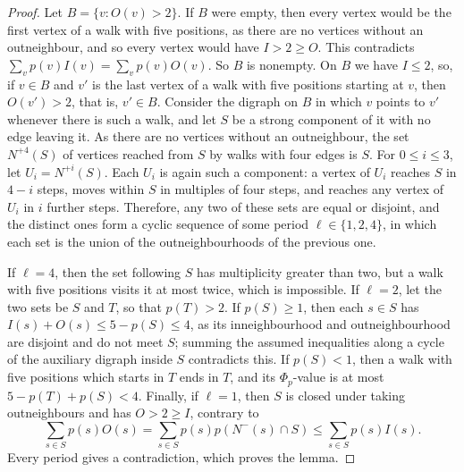 \begin{proof}
Let $B=\{v:O(v)>2\}$. If $B$ were empty, then every vertex would be the first vertex of a walk with five positions, as there are no vertices without an outneighbour, and so every vertex would have $I>2\ge O$. This contradicts $\sum_vp(v)I(v)=\sum_vp(v)O(v)$. So $B$ is nonempty.
On $B$ we have $I\le2$, so, if $v\in B$ and $v'$ is the last vertex of a walk with five positions starting at $v$, then $O(v')>2$, that is, $v'\in B$. Consider the digraph on $B$ in which $v$ points to $v'$ whenever there is such a walk, and let $S$ be a strong component of it with no edge leaving it. As there are no vertices without an outneighbour, the set $N^{+4}(S)$ of vertices reached from $S$ by walks with four edges is $S$. For $0\le i\le3$, let $U_i=N^{+i}(S)$. Each $U_i$ is again such a component: a vertex of $U_i$ reaches $S$ in $4-i$ steps, moves within $S$ in multiples of four steps, and reaches any vertex of $U_i$ in $i$ further steps. Therefore, any two of these sets are equal or disjoint, and the distinct ones form a cyclic sequence of some period $\ell\in\{1,2,4\}$, in which each set is the union of the outneighbourhoods of the previous one.

If $\ell=4$, then the set following $S$ has multiplicity greater than two, but a walk with five positions visits it at most twice, which is impossible.
If $\ell=2$, let the two sets be $S$ and $T$, so that $p(T)>2$. If $p(S)\ge1$, then each $s\in S$ has
$I(s)+O(s)\le5-p(S)\le4$, as its inneighbourhood and outneighbourhood are disjoint
and do not meet $S$; summing the assumed inequalities along a cycle of the auxiliary digraph inside $S$ contradicts this.
If $p(S)<1$, then a walk with five positions which starts in $T$ ends in $T$, and its $\Phi_p$-value is at most $5-p(T)+p(S)<4$.
Finally, if $\ell=1$, then $S$ is closed under taking outneighbours and has $O>2\ge I$, contrary to
\[
 \sum_{s\in S}p(s)O(s)
 =\sum_{s\in S}p(s)p(N^-(s)\cap S)
 \le\sum_{s\in S}p(s)I(s).
\]
Every period gives a contradiction, which proves the lemma.
\end{proof}


